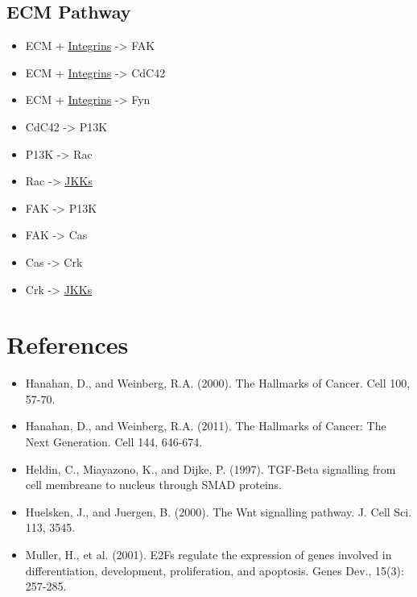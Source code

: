 \documentclass[11pt]{article}
\begin{document}
\subsection{ECM Pathway}
\label{sec-2-9}
\begin{itemize}
\item ECM + \uline{Integrins} -> FAK
\item ECM + \uline{Integrins} -> CdC42
\item ECM + \uline{Integrins} -> Fyn
\item CdC42 -> P13K
\item P13K -> Rac
\item Rac -> \uline{JKKs}
\item FAK -> P13K
\item FAK -> Cas
\item Cas -> Crk
\item Crk -> \uline{JKKs}
\end{itemize}






\section{References}
\label{sec-3}
\begin{itemize}
\item Hanahan, D., and Weinberg, R.A. (2000). The Hallmarks of Cancer. Cell 100, 57-70.
\item Hanahan, D., and Weinberg, R.A. (2011). The Hallmarks of Cancer: The Next Generation. Cell 144, 646-674.
\item Heldin, C., Miayazono, K., and Dijke, P. (1997). TGF-Beta signalling from cell membreane to nucleus through SMAD proteins.
\item Huelsken, J., and Juergen, B. (2000). The Wnt signalling pathway. J. Cell Sci. 113, 3545.
\item Muller, H., et al. (2001). E2Fs regulate the expression of genes involved in differentiation, development, proliferation, and apoptosis. Genes Dev., 15(3): 257-285.
\end{itemize}
\end{document}
